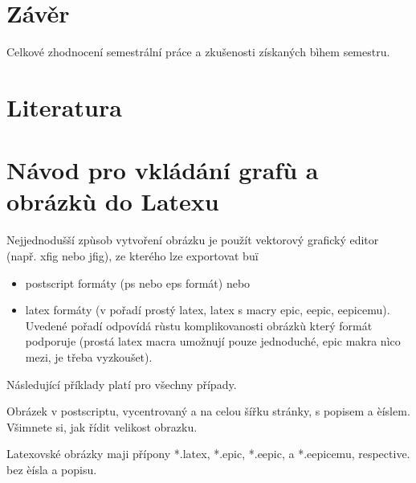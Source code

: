 \documentclass[12pt]{article}
\begin{document}
\section{Závěr}

Celkové zhodnocení semestrální práce a zkušenosti získaných bìhem
semestru.

\section{Literatura}

\appendix

\section{Návod pro vkládání grafù a obrázkù do Latexu}

Nejjednodušší zpùsob vytvoření obrázku je použít vektorový grafický
editor (např. xfig nebo jfig), ze kterého lze exportovat buï
\begin{itemize}
\item postscript formáty (ps nebo eps formát) nebo
\item latex formáty (v pořadí prostý latex, latex s macry epic, eepic, eepicemu). Uvedené pořadí odpovídá rùstu
komplikovanosti obrázkù který formát podporuje (prostá latex macra
umožnují pouze jednoduché, epic makra nìco mezi, je třeba
vyzkoušet).

\end{itemize}
Následující příklady platí pro všechny případy.

Obrázek v postscriptu, vycentrovaný a na celou šířku stránky, s
popisem a èíslem. Všimnete si, jak řídit velikost obrazku.


Latexovské obrázky maji přípony *.latex, *.epic, *.eepic, a
*.eepicemu, respective.
%
bez èísla a popisu.
\end{document}
